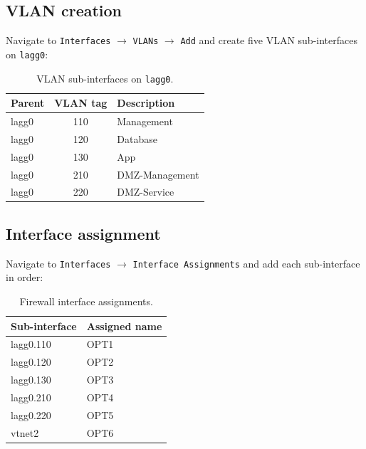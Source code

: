 \subsection{VLAN creation}

Navigate to \texttt{Interfaces} $\rightarrow$ \texttt{VLANs} $\rightarrow$ \texttt{Add} and create five VLAN sub-interfaces on \texttt{lagg0}:

\begin{table}[htbp]
    \centering
    \caption{VLAN sub-interfaces on \texttt{lagg0}.}
    \label{tab:fw-vlans}
    \begin{tabular}{|l|c|l|}
        \hline
        \textbf{Parent} & \textbf{VLAN tag} & \textbf{Description} \\
        \hline
        lagg0 & 110 & Management \\
        lagg0 & 120 & Database \\
        lagg0 & 130 & App \\
        lagg0 & 210 & DMZ-Management \\
        lagg0 & 220 & DMZ-Service \\
        \hline
    \end{tabular}
\end{table}

\subsection{Interface assignment}

Navigate to \texttt{Interfaces} $\rightarrow$ \texttt{Interface Assignments} and add each sub-interface in order:

\begin{table}[htbp]
    \centering
    \caption{Firewall interface assignments.}
    \label{tab:fw-if-assign}
    \begin{tabular}{|l|l|}
        \hline
        \textbf{Sub-interface} & \textbf{Assigned name} \\
        \hline
        lagg0.110 & OPT1 \\
        lagg0.120 & OPT2 \\
        lagg0.130 & OPT3 \\
        lagg0.210 & OPT4 \\
        lagg0.220 & OPT5 \\
        vtnet2 & OPT6 \\
        \hline
    \end{tabular}
\end{table}

